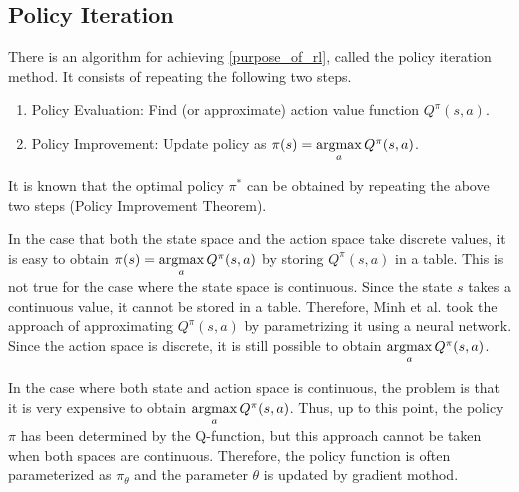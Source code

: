 \documentclass[english, dvipdfmx]{ampmt}             %
\newcommand{\argmax}{\mathop{\rm argmax}\limits}
\begin{document}
\subsection{Policy Iteration}
\label{sec:policy_improvement}
There is an algorithm for achieving \eqref{purpose_of_rl}, called the policy iteration method. It consists of repeating the following two steps.
\begin{enumerate}
	\item Policy Evaluation: Find (or approximate) action value function $Q^{\pi}(s,a)$.
	\item Policy Improvement: Update policy as $\pi(s)=\argmax_aQ^{\pi}(s,a)$.
\end{enumerate}
It is known that the optimal policy $\pi^{*}$ can be obtained by repeating the above two steps (Policy Improvement Theorem\cite{RL}).\par
In the case that both the state space and the action space take discrete values, it is easy to obtain
$\pi(s)=\argmax_aQ^{\pi}(s,a)$ by storing $Q^{\pi}(s,a)$ in a table. This is not true for the case where the state space is continuous. Since the state $s$ takes a continuous value, it cannot be stored in a table. Therefore, Minh et al.\cite{DQN} took the approach of approximating $Q^{\pi}(s,a)$ by parametrizing it using a neural network. Since the action space is discrete, it is still possible to obtain $\argmax_aQ^{\pi}(s,a)$. \par
In the case where both state and action space is continuous, the problem is that it is very expensive to obtain $\argmax_aQ^{\pi}(s,a)$. Thus, up to this point, the policy $\pi$ has been determined by the Q-function, but this approach cannot be taken when both spaces are continuous. 
Therefore, the policy function is often parameterized as $\pi_{\theta}$ and the parameter $\theta$ is updated by gradient mothod. 
\end{document}
